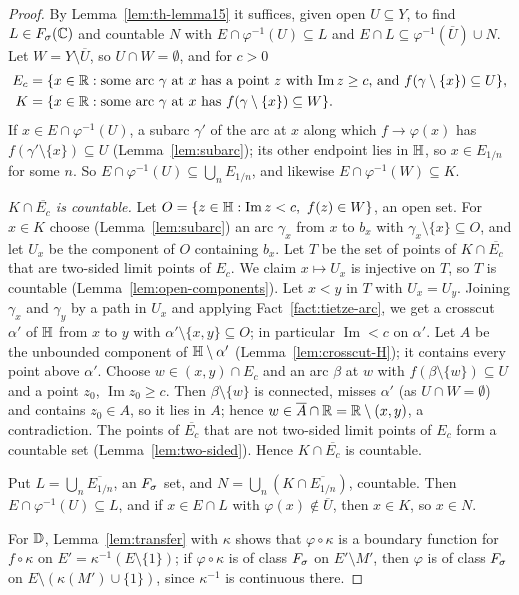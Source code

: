 \begin{proof}
By Lemma~\ref{lem:th-lemma15} it suffices, given open $U\subseteq Y$, to find $L\in F_\sigma(\mathbb{C})$ and countable
$N$ with $E\cap\varphi^{-1}(U)\subseteq L$ and $E\cap L\subseteq\varphi^{-1}(\overline U)\cup N$. Let
$W=Y\setminus\overline U$, so $U\cap W=\emptyset$, and for $c>0$
\begin{align*}
E_c&=\{x\in\mathbb{R}:\text{some arc $\gamma$ at $x$ has a point $z$ with $\operatorname{Im}z\ge c$, and }
f(\gamma\setminus\{x\})\subseteq U\},\\
K&=\{x\in\mathbb{R}:\text{some arc $\gamma$ at $x$ has }f(\gamma\setminus\{x\})\subseteq W\}.
\end{align*}
If $x\in E\cap\varphi^{-1}(U)$, a subarc $\gamma'$ of the arc at $x$ along which $f\to\varphi(x)$ has
$f(\gamma'\setminus\{x\})\subseteq U$ (Lemma~\ref{lem:subarc}); its other endpoint lies in $\mathbb{H}$, so $x\in E_{1/n}$
for some $n$. So $E\cap\varphi^{-1}(U)\subseteq\bigcup_nE_{1/n}$, and likewise $E\cap\varphi^{-1}(W)\subseteq K$.

\emph{$K\cap\overline{E_c}$ is countable.} Let $O=\{z\in\mathbb{H}:\operatorname{Im}z<c,\ f(z)\in W\}$, an open set. For
$x\in K$ choose (Lemma~\ref{lem:subarc}) an arc $\gamma_x$ from $x$ to $b_x$ with $\gamma_x\setminus\{x\}\subseteq O$,
and let $U_x$ be the component of $O$ containing $b_x$. Let $T$ be the set of points of $K\cap\overline{E_c}$
that are two-sided limit points of $E_c$. We claim $x\mapsto U_x$ is injective on $T$, so $T$ is countable
(Lemma~\ref{lem:open-components}). Let $x<y$ in $T$ with $U_x=U_y$. Joining $\gamma_x$ and $\gamma_y$ by a path in
$U_x$ and applying Fact~\ref{fact:tietze-arc}, we get a crosscut $\alpha'$ of $\mathbb{H}$ from $x$ to $y$ with
$\alpha'\setminus\{x,y\}\subseteq O$; in particular $\operatorname{Im}<c$ on $\alpha'$. Let $A$ be the unbounded component
of $\mathbb{H}\setminus\alpha'$ (Lemma~\ref{lem:crosscut-H}); it contains every point above $\alpha'$. Choose
$w\in(x,y)\cap E_c$ and an arc $\beta$ at $w$ with $f(\beta\setminus\{w\})\subseteq U$ and a point $z_0$,
$\operatorname{Im}z_0\ge c$. Then $\beta\setminus\{w\}$ is connected, misses $\alpha'$ (as $U\cap W=\emptyset$) and
contains $z_0\in A$, so it lies in $A$; hence $w\in\overline A\cap\mathbb{R}=\mathbb{R}\setminus(x,y)$, a contradiction. The points
of $\overline{E_c}$ that are not two-sided limit points of $E_c$ form a countable set (Lemma~\ref{lem:two-sided}).
Hence $K\cap\overline{E_c}$ is countable.

Put $L=\bigcup_n\overline{E_{1/n}}$, an $F_\sigma$ set, and $N=\bigcup_n(K\cap\overline{E_{1/n}})$, countable. Then
$E\cap\varphi^{-1}(U)\subseteq L$, and if $x\in E\cap L$ with $\varphi(x)\notin\overline U$, then $x\in K$, so $x\in N$.

For $\mathbb{D}$, Lemma~\ref{lem:transfer} with $\kappa$ shows that $\varphi\circ\kappa$ is a boundary function for
$f\circ\kappa$ on $E'=\kappa^{-1}(E\setminus\{1\})$; if $\varphi\circ\kappa$ is of class $F_\sigma$ on $E'\setminus M'$, then
$\varphi$ is of class $F_\sigma$ on $E\setminus(\kappa(M')\cup\{1\})$, since $\kappa^{-1}$ is continuous there.
\end{proof}

